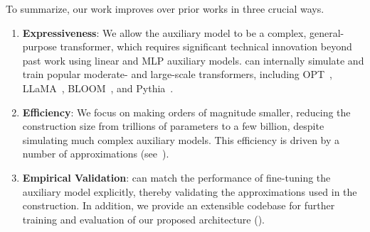 To summarize, our work improves over prior works in three crucial ways.
\begin{enumerate}
	\item \textbf{Expressiveness}: We allow the auxiliary model to be a complex, general-purpose transformer, which requires significant technical innovation beyond past work using linear and MLP auxiliary models. \simulator{} can internally simulate and train popular moderate- and large-scale transformers, including OPT~\citep{zhang2022opt}, LLaMA~\citep{touvron2023llama}, BLOOM~\citep{scao2022bloom}, and Pythia~\citep{biderman2023pythia}. 
	\item \textbf{Efficiency}: We focus on making \simulator{} orders of magnitude smaller, reducing the construction size from trillions of parameters to a few billion, despite simulating much complex auxiliary models. This efficiency is driven by a number of approximations (see~).
	\item \textbf{Empirical Validation}:  \simulator{} can match the performance of fine-tuning the auxiliary model explicitly, thereby validating the approximations used in the construction. %
 In addition, we provide an extensible codebase for further training and evaluation of our proposed architecture ().
\end{enumerate}
\fi